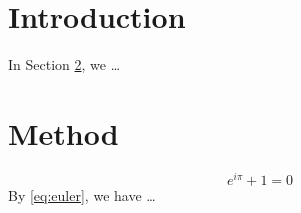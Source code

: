 \documentclass{article}
\begin{document}
\section{Introduction}
\label{sec:intro}
In Section \ref{sec:method}, we \ldots
\section{Method}
\label{sec:method}
\begin{equation}
\label{eq:euler}
e^{i\pi} + 1 = 0
\end{equation}
By \eqref{eq:euler}, we have \ldots
\end{document}
